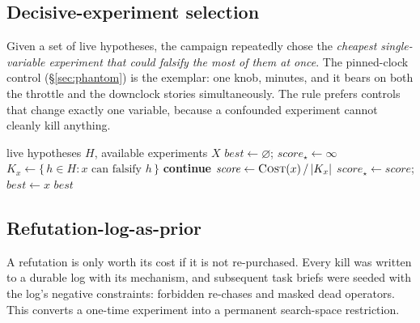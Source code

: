 \documentclass[11pt]{article}
\begin{document}
\subsection{Decisive-experiment selection}
\label{sec:decisive}

Given a set of live hypotheses, the campaign repeatedly chose the \emph{cheapest single-variable
experiment that could falsify the most of them at once}. The pinned-clock control (\S\ref{sec:phantom})
is the exemplar: one knob, minutes, and it bears on both the throttle and the downclock stories
simultaneously. The rule prefers controls that change exactly one variable, because a confounded
experiment cannot cleanly kill anything.

\begin{algorithm}[h]
\caption{\textsc{DecisiveExperiment} --- maximize hypotheses-killed per unit cost}
\label{alg:decisive}
\begin{algorithmic}[1]
\Require live hypotheses $H$, available experiments $X$
\State $\mathit{best} \gets \varnothing$; \; $\mathit{score}_\star \gets \infty$
 
  \State $K_x \gets \{\, h \in H : x \text{ can falsify } h \,\}$ 
   \State \textbf{continue} \EndIf
  \State $\mathit{score} \gets \textsc{Cost}(x) \,/\, |K_x|$ 
   \State $\mathit{score}_\star \gets \mathit{score}$; \; $\mathit{best} \gets x$ \EndIf
\EndFor
\State \Return $\mathit{best}$ 
\end{algorithmic}
\end{algorithm}

\subsection{Refutation-log-as-prior}
\label{sec:logprior}

A refutation is only worth its cost if it is not re-purchased. Every kill was written to a durable log with
its mechanism, and subsequent task briefs were seeded with the log's negative constraints: forbidden
re-chases and masked dead operators. This converts a one-time experiment into a permanent search-space
restriction.
\end{document}
